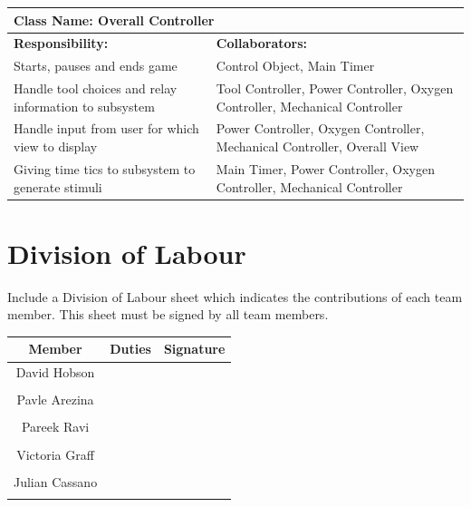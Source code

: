 \documentclass[12pt, titlepage]{article}
\begin{document}
\begin{enumerate}[a)]
	\begin{table}[H]
		\centering
		\begin{tabular}{|p{10cm}|p{5cm}|}
		\hline 
		 \multicolumn{2}{|l|}{\textbf{Class Name: Overall Controller}} \\
		\hline
		\textbf{Responsibility:} & \textbf{Collaborators:} \\
		\hline
		 Starts, pauses and ends game & Control Object, Main Timer \\
		\hline
		 Handle tool choices and relay information to subsystem & Tool Controller, Power Controller, Oxygen Controller, Mechanical Controller\\
		\hline
		 Handle input from user for which view to display & Power Controller, Oxygen Controller, Mechanical Controller, Overall View \\
		\hline
		 Giving time tics to subsystem to generate stimuli & Main Timer, Power Controller, Oxygen Controller, Mechanical Controller \\
		\hline
		\end{tabular}
	\end{table}

\end{enumerate}

\appendix
\section{Division of Labour}
\label{sec:division_of_labour}
Include a Division of Labour sheet which indicates the contributions of each team member. This sheet must be signed by all team members.
\begin{table}[h!]
\centering

\begin{tabular}{|c|c|c|}
\hline
{\bf Member} & {\bf Duties}&{\bf Signature}\\
\hline
{David Hobson} & { } & { }\\
{} & {}  & {}\\
\hline
{Pavle Arezina} & {} & {}\\
{} & {} & {}\\
\hline
{Pareek Ravi} & {} & {}\\
{} & {} & {}\\
\hline
{Victoria Graff} & {} & {}\\
{} & {} & {}\\
\hline
{Julian Cassano} & {} & {}\\
{} & {} & {}\\
\hline
\end{tabular}

\end{table}
\end{document}
